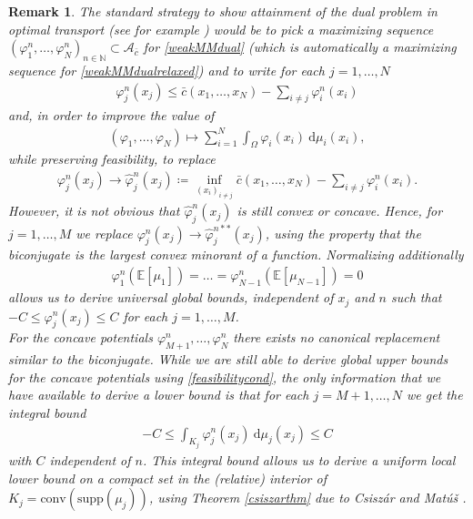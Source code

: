 \documentclass[10pt,a4paper]{amsart}
\newcommand{\NN}{\mathbb{N}}
\newcommand{\EE}{\mathbb{E}}
\newcommand{\dd}{\mathrm{d}}
\newtheorem{rmk}[thm]{Remark}
\begin{document}
\begin{rmk}\label{attainmentlmarmk}
	The standard strategy to show attainment of the dual problem in optimal transport (see for example \cite[Prop 1.11]{santambrogio2015}) would be to pick a maximizing sequence $(\varphi_1^n,\dots,\varphi_N^n)_{n\in\NN}\subset\mathcal A_{\bar c}$ for \eqref{weakMMdual} (which is automatically a maximizing sequence for \eqref{weakMMdualrelaxed}) and to write for each $j=1,\dots,N$
	\begin{gather}\label{feasibilitycond}
		\varphi_j^n(x_j)\leq\bar c(x_1,\dots,x_N)-\sum_{i\neq j}\varphi_i^n(x_i)
	\end{gather}
	and, in order to improve the value of
	\begin{gather*}
		(\varphi_1,\dots,\varphi_N)\mapsto\sum_{i=1}^N\int_\Omega\varphi_i(x_i)\ \dd\mu_i(x_i),
	\end{gather*}
	while preserving feasibility, to replace
	\begin{gather*}
		\varphi_j^n(x_j)\rightarrow\hat\varphi_j^n(x_j)\coloneqq \inf_{(x_i)_{i\neq j}}\bar c(x_1,\dots,x_N)-\sum_{i\neq j}\varphi_i^n(x_i).
	\end{gather*}
	However, it is not obvious that $\hat\varphi_j^n(x_j)$ is still convex or concave. Hence, for $j=1,\dots,M$ we replace $\varphi_j^n(x_j)\rightarrow\hat\varphi_j^{n**}(x_j)$, using the property that the biconjugate is the largest convex minorant of a function. Normalizing additionally
	\begin{gather*}
		\varphi_1^n(\EE[\mu_1])=\dots=\varphi_{N-1}^n(\EE[\mu_{N-1}])=0
	\end{gather*}
	allows us to derive universal global bounds, independent of $x_j$ and $n$ such that $-C\leq \varphi_j^n(x_j)\leq C$ for each $j=1,\dots,M$.\\
	For the concave potentials $\varphi_{M+1}^n,\dots,\varphi_N^n$ there exists no canonical replacement similar to the biconjugate. While we are still able to derive global upper bounds for the concave potentials using \eqref{feasibilitycond}, the only information that we have available to derive a lower bound is that for each $j=M+1,\dots,N$ we get the integral bound
	\begin{gather*}
		-C\leq \int_{K_j}\varphi_j^n(x_j)\ \dd\mu_j(x_j)\leq C
	\end{gather*}
	with $C$ independent of $n$. This integral bound allows us to derive a uniform local lower bound on a compact set in the (relative) interior of $K_j=\text{conv}(\text{supp}(\mu_j))$, using Theorem \ref{csiszarthm} due to Csiszár and Matú\v{s} \cite{csiszar2001}.\\

\end{rmk}
\end{document}
